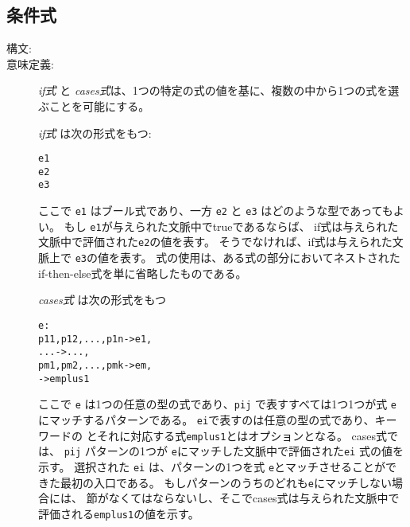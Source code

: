 \documentclass[\pformat,12pt]{jarticle}
\begin{document}
\subsection{条件式}
\label{if-exp} \label{cases-exp}
\begin{description}
\item[構文:]


                     




\item[意味定義:]  {\it if式} と {\it cases式}は、1つの特定の式の値を基に、複数の中から1つの式を選ぶことを可能にする。

  {\it if式} は次の形式をもつ:
  \begin{alltt}
     e1
     e2
     e3
  \end{alltt}
ここで {\tt e1} はブール式であり、一方  {\tt e2} と {\tt e3} はどのような型であってもよい。
もし {\tt e1}が与えられた文脈中でtrueであるならば、 if式は与えられた文脈中で評価された{\tt e2}の値を表す。
そうでなければ、if式は与えられた文脈上で {\tt e3}の値を表す。
 式の使用は、ある式の部分においてネストされたif-then-else式を単に省略したものである。

  {\it cases式} は次の形式をもつ
  \begin{alltt}
     e :
      p11, p12, ..., p1n -> e1,
      ...                -> ...,
      pm1, pm2, ..., pmk -> em,
                   -> emplus1
  \end{alltt}
 ここで {\tt e} は1つの任意の型の式であり、{\tt pij} で表すすべては1つ1つが式 {\tt e}にマッチするパターンである。 
{\tt  ei}で表すのは任意の型の式であり、キーワードの  とそれに対応する式{\tt emplus1}とはオプションとなる。 
cases式では、 {\tt pij} パターンの1つが {\tt e}にマッチした文脈中で評価された{\tt ei} 式の値を示す。 
選択された {\tt ei} は、パターンの1つを式 {\tt e}とマッチさせることができた最初の入口である。
もしパターンのうちのどれも{\tt e}にマッチしない場合には、  節がなくてはならないし、そこでcases式は与えられた文脈中で評価される{\tt emplus1}の値を示す。
     

\end{description}
\end{document}
